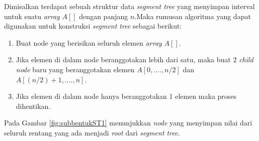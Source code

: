 \quad Dimisalkan terdapat sebuah struktur data \textit{segment tree} yang menyimpan interval untuk suatu \textit{array} $A[]$ dengan panjang $n$.Maka rumusan algoritma yang dapat digunakan untuk konstruksi \textit{segment tree} sebagai berikut\cite{ST2}:
\begin{enumerate}
	\item Buat node yang berisikan seluruh elemen \textit{array} $A[]$.
	\item Jika elemen di dalam node beranggotakan lebih dari satu, maka buat $2$ \textit{child node} baru yang beranggotakan elemen $A[0,... .,n/2]$ dan $A[(n/2)+1,... .,n]$.
	\item Jika elemen di dalam node hanya beranggotakan 1 elemen maka proses dihentikan.
\end{enumerate}
\quad Pada Gambar \ref{fig:subbentukST1} menunjukkan  \textit{node} yang menyimpan nilai dari seluruh rentang yang ada menjadi \textit{root} dari \textit{segment tree}.
